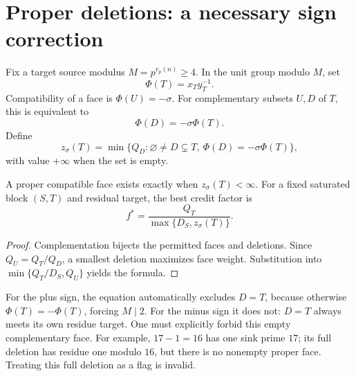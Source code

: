 \section{Proper deletions: a necessary sign correction}
Fix a target source modulus \(M=p^{v_p(n)}\ge4\). In the unit group modulo \(M\), set
\[
 \Phi(T)=x_Ty_T^{-1}.
\]
Compatibility of a face is \(\Phi(U)=-\sigma\). For complementary subsets \(U,D\) of \(T\), this is equivalent to
\[
 \Phi(D)=-\sigma\Phi(T).
\]
Define
\[
 z_\sigma(T)=\min\{Q_D:\varnothing\ne D\subsetneq T,
               \ \Phi(D)=-\sigma\Phi(T)\},
\]
with value \(+\infty\) when the set is empty.
\begin{proposition}\label{signed:prop:deletion}
A proper compatible face exists exactly when \(z_\sigma(T)<\infty\). For a fixed saturated block \((S,T)\) and residual target, the best credit factor is
\[
 f^*=\frac{Q_T}{\max\{D_S,z_\sigma(T)\}}.
\]
\end{proposition}
\begin{proof}
Complementation bijects the permitted faces and deletions. Since \(Q_U=Q_T/Q_D\), a smallest deletion maximizes face weight. Substitution into \(\min\{Q_T/D_S,Q_U\}\) yields the formula.
\end{proof}
For the plus sign, the equation automatically excludes \(D=T\), because otherwise \(\Phi(T)=-\Phi(T)\), forcing \(M\mid2\). For the minus sign it does not: \(D=T\) always meets its own residue target. One must explicitly forbid this empty complementary face. For example, \(17-1=16\) has one sink prime \(17\); its full deletion has residue one modulo \(16\), but there is no nonempty proper face. Treating this full deletion as a flag is invalid.

